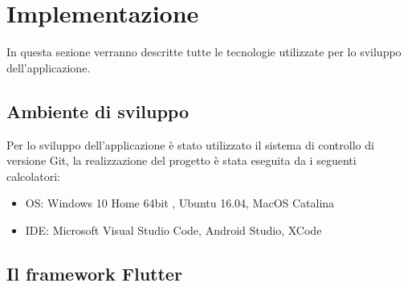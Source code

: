 \chapter{Implementazione\label{sec:implementazione}}
In questa sezione verranno descritte tutte le tecnologie utilizzate per lo sviluppo dell'applicazione.
\section{Ambiente di sviluppo\label{sec:ambiente}}
Per lo sviluppo dell'applicazione è stato utilizzato il sistema di controllo di versione Git,  la realizzazione del progetto è stata eseguita da i seguenti calcolatori:
\begin{itemize}
	\item OS: Windows 10 Home 64bit , Ubuntu 16.04, MacOS Catalina
	\item IDE: Microsoft Visual Studio Code, Android Studio, XCode
\end{itemize}
\section{Il framework Flutter\label{sec:flutter}}
